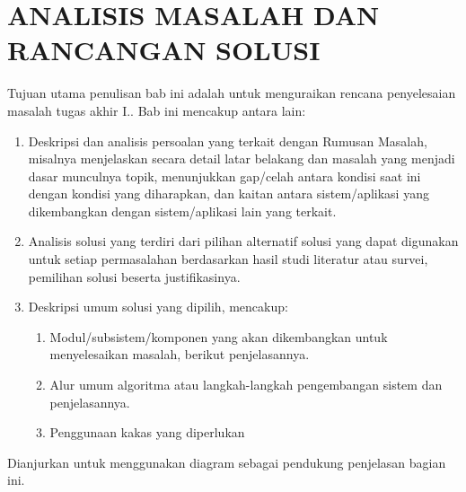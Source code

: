 \chapter{ANALISIS MASALAH DAN RANCANGAN SOLUSI}

Tujuan utama penulisan bab ini adalah untuk menguraikan rencana penyelesaian masalah tugas akhir I.. Bab ini mencakup antara lain:

\begin{enumerate}

    \item Deskripsi dan analisis persoalan yang terkait dengan Rumusan Masalah, misalnya menjelaskan secara detail latar belakang dan masalah yang menjadi dasar munculnya topik, menunjukkan gap/celah antara kondisi saat ini dengan kondisi yang diharapkan, dan kaitan antara sistem/aplikasi yang dikembangkan dengan sistem/aplikasi lain yang terkait.

    \item Analisis solusi yang terdiri dari pilihan alternatif solusi yang dapat digunakan untuk setiap permasalahan berdasarkan hasil studi literatur atau survei, pemilihan solusi beserta justifikasinya.

    \item Deskripsi umum solusi yang dipilih, mencakup:
    \begin{enumerate}
        \item Modul/subsistem/komponen yang akan dikembangkan untuk menyelesaikan masalah, berikut penjelasannya.
        \item Alur umum algoritma atau langkah-langkah pengembangan sistem dan penjelasannya.
        \item Penggunaan kakas yang diperlukan
    \end{enumerate}
\end{enumerate}

Dianjurkan untuk menggunakan diagram sebagai pendukung penjelasan bagian ini.